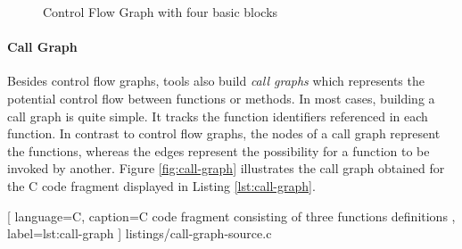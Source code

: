 \begin{figure}[ht]
    \centering
    \caption{Control Flow Graph with four basic blocks \cite{chess2007secure}}
    \label{fig:control-flow}
\end{figure}

\paragraph{Call Graph} Besides control flow graphs, tools also build \emph{call graphs} which represents the potential control flow between functions or methods. In most cases, building a call graph is quite simple. It tracks the function identifiers referenced in each function. In contrast to control flow graphs, the nodes of a call graph represent the functions, whereas the edges represent the possibility for a function to be invoked by another. Figure \ref{fig:call-graph} illustrates the call graph obtained for the C code fragment displayed in Listing \ref{lst:call-graph}.

\vspace{0.5cm}


    [
        language=C,
        caption=C code fragment consisting of three functions definitions \cite{chess2007secure},
        label=lst:call-graph
    ]
    {listings/call-graph-source.c}

